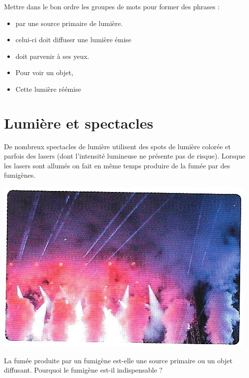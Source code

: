 \documentclass[a4paper,11pt]{exam}
\begin{document}
Mettre dans le bon ordre les groupes de mots pour former des phrases :
\begin{multicols}{2}
	\begin{itemize}
		\item par une source primaire de lumière.
		\item celui-ci doit diffuser une lumière émise
		\item doit parvenir à ses yeux.
		\item Pour voir un objet,
		\item Cette lumière réémise
	\end{itemize}
\end{multicols}

\vspace*{-0.5cm}
\section{Lumière et spectacles}

De nombreux spectacles de lumière utilisent des spots de lumière colorée et parfois des lasers (dont l'intensité lumineuse ne présente pas de risque). Lorsque les lasers sont allumés on fait en même temps produire de la fumée par des fumigènes.
\begin{multicols}{2}
	\includegraphics[scale=0.3]{fumees}
	
	\begin{questions}
		\question La fumée produite par un fumigène est-elle une source primaire ou un objet diffusant.
		\question Pourquoi le fumigène est-il indispensable ?
	\end{questions}
	
\end{multicols}
\end{document}
